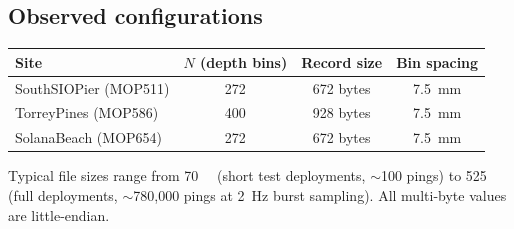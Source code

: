 \subsection{Observed configurations}

\begin{tabular}{lccc}
\hline
Site & $N$ (depth bins) & Record size & Bin spacing \\
\hline
SouthSIOPier (MOP511) & 272 & 672 bytes & \SI{7.5}{\milli\meter} \\
TorreyPines (MOP586) & 400 & 928 bytes & \SI{7.5}{\milli\meter} \\
SolanaBeach (MOP654) & 272 & 672 bytes & \SI{7.5}{\milli\meter} \\
\hline
\end{tabular}

Typical file sizes range from \SI{70}{\mega\byte} (short test
deployments, $\sim$100 pings) to \SI{525}{\mega\byte} (full
deployments, $\sim$780{,}000 pings at \SI{2}{\hertz} burst sampling).
All multi-byte values are little-endian.
